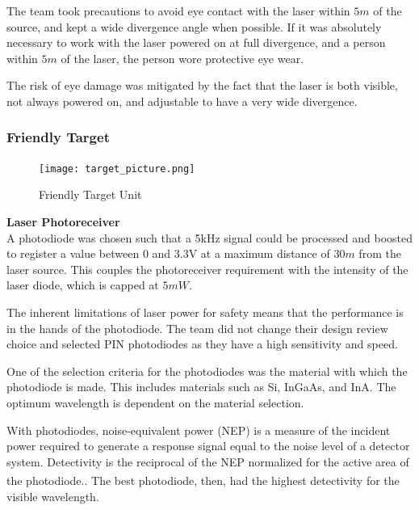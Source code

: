 \documentclass[letterpaper,10pt]{article}
\begin{document}
\begin{spacing}{1.15}
 The team took precautions to avoid eye contact with the laser within $5 m$ of the source, and kept a wide divergence angle when possible. If it was absolutely necessary to work with the laser powered on at full divergence, and a person within $5m$ of the laser, the person wore protective eye wear. 
 
 The risk of eye damage was mitigated by the fact that the laser is both visible, not always powered on, and adjustable to have a very wide divergence. 

\subsubsection{Friendly Target}


\begin{figure} [H]
	\centering
	\texttt{[image: target\_picture.png]}
	\caption{Friendly Target Unit\label{fig:target-unit}}
\end{figure}


\hspace{5mm}\textbf{Laser Photoreceiver} \label{section:laser-photoreceiver-design-procedure}\\
A photodiode was chosen such that a 5kHz signal could be processed and boosted to register a value between 0 and 3.3V at a maximum distance of $30m$ from the laser source. This couples the photoreceiver requirement with the intensity of the laser diode, which is capped at $5 mW$. 

The inherent limitations of laser power for safety means that the performance is in the hands of the photodiode. The team did not change their design review choice and selected PIN photodiodes as they have a high sensitivity and speed.

One of the selection criteria for the photodiodes was the material with which the photodiode is made. This includes materials such as Si, InGaAs, and InA. The optimum wavelength is dependent on the material selection.

With photodiodes, noise-equivalent power (NEP) is a measure of the incident power required to generate a response signal equal to the noise level of a detector system. Detectivity is the reciprocal of the NEP normalized for the active area of the photodiode.\textsuperscript{\cite{Microphotonics}}. The best photodiode, then, had the highest detectivity for the visible wavelength.  


\end{spacing}
\end{document}
